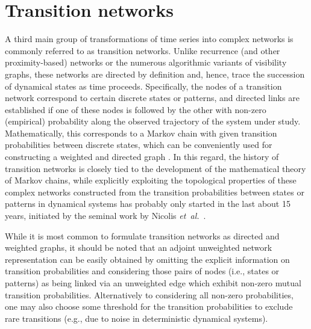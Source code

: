 \section{Transition networks} \label{sec:TransitionNt}

A third main group of transformations of time series into complex networks is commonly referred to as transition networks. Unlike recurrence (and other proximity-based) networks or the numerous algorithmic variants of visibility graphs, these networks are directed by definition and, hence, trace the succession of dynamical states as time proceeds. Specifically, the nodes of a transition network correspond to certain discrete states or patterns, and directed links are established if one of these nodes is followed by the other with non-zero (empirical) probability along the observed trajectory of the system under study. Mathematically, this corresponds to a Markov chain with given transition probabilities between discrete states, which can be conveniently used for constructing a weighted and directed graph \cite{Schnakenberg1976}. In this regard, the history of transition networks is closely tied to the development of the mathematical theory of Markov chains, while explicitly exploiting the topological properties of these complex networks constructed from the transition probabilities between states or patterns in dynamical systems has probably only started in the last about 15 years, initiated by the seminal work by Nicolis \emph{et~al.}~\cite{Nicolis2005}. 

While it is most common to formulate transition networks as directed and weighted graphs, it should be noted that an adjoint unweighted network representation can be easily obtained by omitting the explicit information on transition probabilities and considering those pairs of nodes (i.e., states or patterns) as being linked via an unweighted edge which exhibit non-zero mutual transition probabilities. Alternatively to considering all non-zero probabilities, one may also choose some threshold for the transition probabilities to exclude rare transitions (e.g., due to noise in deterministic dynamical systems).

